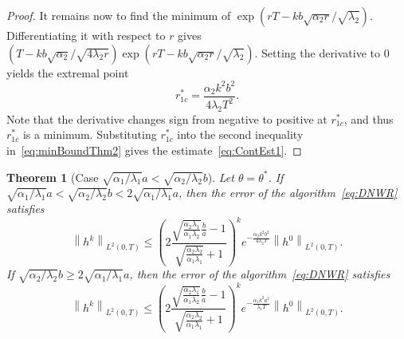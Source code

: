 \documentclass[10pt,a4paper]{amsart}
\newtheorem{theorem}{Theorem}
\newcommand{\norm}[1]{\left\lVert#1\right\rVert}
\begin{document}
\begin{proof}
It remains now to find the minimum of $\exp(rT - kb\sqrt{\alpha_2r}/\sqrt{\lambda_2})$. Differentiating it with respect to $r$ gives $(T - k b\sqrt{\alpha_2}/\sqrt{4\lambda_2 r}) \exp(rT - kb \sqrt{\alpha_2 r}/\sqrt{\lambda_2})$. Setting the derivative to 0 yields the extremal point
\begin{equation}\label{eq:ropt-case1}
r^*_{1c} = \frac{\alpha_2k^2 b^2}{4\lambda_2T^2}.
\end{equation}
Note that the derivative changes sign from negative to positive at $r^*_{1c}$, and thus $r^*_{1c}$ is a minimum. Substituting $r^*_{1c}$ into the second inequality in~\eqref{eq:minBoundThm2} gives the estimate~\eqref{eq:ContEst1}.
\end{proof}


\begin{theorem}[Case $\sqrt{\alpha_1/\lambda_1} a < \sqrt{\alpha_2/\lambda_2} b$]\label{thm:cont-case2}
Let $\theta = \theta^*$. If $\sqrt{\alpha_1/\lambda_1} a < \sqrt{\alpha_2/\lambda_2} b < 2\sqrt{\alpha_1/\lambda_1} a$, then the error of the algorithm~\eqref{eq:DNWR} satisfies 
\begin{equation}\label{eq:estimate-case2-1}
\norm{h^k}_{L^2(0, T)} \leq \left(2\frac{\sqrt{\frac{\alpha_2 \lambda_1}{\alpha_1\lambda_2}}\frac{b}{a} - 1}{\sqrt{\frac{\alpha_2 \lambda_2}{\alpha_1\lambda_1}}+1} \right)^k e^{-\frac{\alpha_2 k^2b^2}{4\lambda_2 T}} \norm{h^0}_{L^2(0, T)}.
\end{equation}
If $\sqrt{\alpha_2/\lambda_2} b \geq 2\sqrt{\alpha_1/\lambda_1} a$, then the error of the algorithm~\eqref{eq:DNWR} satisfies 
\begin{equation}\label{eq:estimate-case2-2}
\norm{h^k}_{L^2(0, T)} \leq \left(2\frac{\sqrt{\frac{\alpha_2 \lambda_1}{\alpha_1\lambda_2}}\frac{b}{a} - 1}{\sqrt{\frac{\alpha_2 \lambda_2}{\alpha_1\lambda_1}}+1} \right)^k e^{-\frac{\alpha_1 k^2a^2}{\lambda_1 T}} \norm{h^0}_{L^2(0, T)}.
\end{equation}
\end{theorem}
\end{document}
